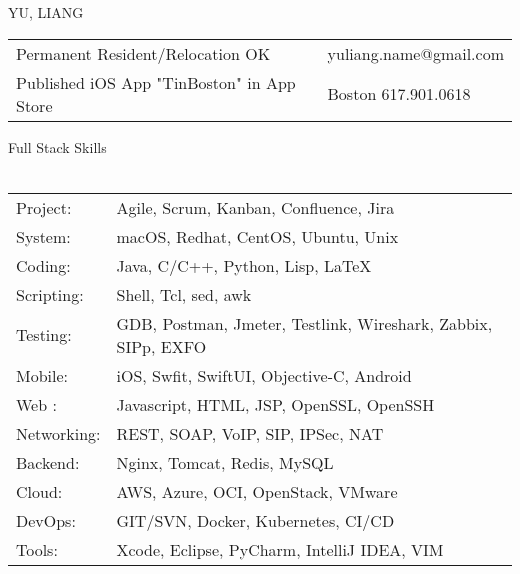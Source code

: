 \documentclass[10pt]{article}
\newcommand{\lineunder}{\vspace*{-8pt}\\\hspace*{-18pt}\hrulefill\\}
\newcommand{\header}[1]{{\hspace*{-15pt}\vspace*{6pt}\large{{#1}}}\vspace*{-6pt}\lineunder}
\begin{document}
\pagestyle{CVfooter}

\vspace*{-40pt}
\begin{center}
{\LARGE \scshape {YU, LIANG}}
\end{center}



\begin{center}

\begin{tabular}{l l}
\small{Permanent Resident/Relocation OK}    & \small{yuliang.name@gmail.com} \\
\small{Published iOS App "TinBoston" in App Store}         & \small{Boston 617.901.0618} \\
\end{tabular}

\end{center}



\header{Full Stack Skills}

\begin{tabular}{l l}


Project: & Agile, Scrum, Kanban, Confluence, Jira \\
System: & macOS, Redhat, CentOS, Ubuntu, Unix \\
Coding: & Java, C/C++, Python, Lisp, \LaTeX \\
Scripting: & Shell, Tcl, sed, awk \\
Testing: & GDB, Postman, Jmeter, Testlink, Wireshark, Zabbix, SIPp, EXFO \\
Mobile: & iOS, Swfit, SwiftUI, Objective-C, Android \\
Web : & Javascript, HTML, JSP, OpenSSL, OpenSSH \\
Networking: & REST, SOAP, VoIP, SIP, IPSec, NAT  \\
Backend: & Nginx, Tomcat, Redis, MySQL \\
Cloud: & AWS, Azure, OCI, OpenStack, VMware \\
DevOps: & GIT/SVN, Docker, Kubernetes, CI/CD \\
Tools: & Xcode, Eclipse, PyCharm, IntelliJ IDEA, VIM \\


\end{tabular}
\end{document}
